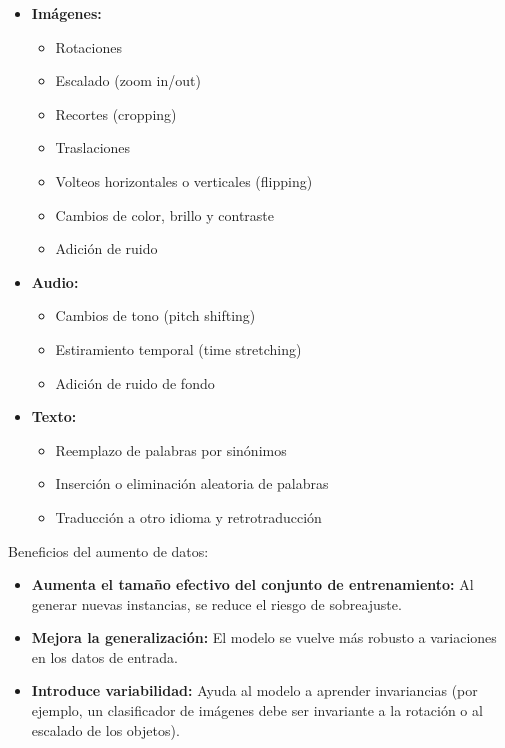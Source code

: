 \documentclass{article}
\begin{document}
\begin{itemize}
    \item \textbf{Imágenes:}
        \begin{itemize}
            \item Rotaciones
            \item Escalado (zoom in/out)
            \item Recortes (cropping)
            \item Traslaciones
            \item Volteos horizontales o verticales (flipping)
            \item Cambios de color, brillo y contraste
            \item Adición de ruido
        \end{itemize}
    \item \textbf{Audio:}
        \begin{itemize}
            \item Cambios de tono (pitch shifting)
            \item Estiramiento temporal (time stretching)
            \item Adición de ruido de fondo
        \end{itemize}
    \item \textbf{Texto:}
        \begin{itemize}
            \item Reemplazo de palabras por sinónimos
            \item Inserción o eliminación aleatoria de palabras
            \item Traducción a otro idioma y retrotraducción
        \end{itemize}
\end{itemize}

Beneficios del aumento de datos:

\begin{itemize}
    \item \textbf{Aumenta el tamaño efectivo del conjunto de entrenamiento:}  Al generar nuevas instancias, se reduce el riesgo de sobreajuste.
    \item \textbf{Mejora la generalización:}  El modelo se vuelve más robusto a variaciones en los datos de entrada.
    \item \textbf{Introduce variabilidad:}  Ayuda al modelo a aprender invariancias (por ejemplo, un clasificador de imágenes debe ser invariante a la rotación o al escalado de los objetos).
\end{itemize}
\end{document}
